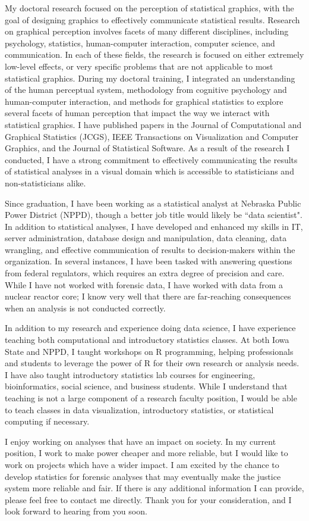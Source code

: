 \documentclass[12pt, letterpaper, sans]{moderncv}
\begin{document}
My doctoral research focused on the perception of statistical graphics, with the goal of designing graphics to effectively communicate statistical results. Research on graphical perception involves facets of many different disciplines, including psychology, statistics, human-computer interaction, computer science, and communication. In each of these fields, the research is focused on either extremely low-level effects, or very specific problems that are not applicable to most statistical graphics. During my doctoral training, I integrated an understanding of the human perceptual system, methodology from cognitive psychology and human-computer interaction, and methods for graphical statistics to explore several facets of human perception that impact the way we interact with statistical graphics. I have published papers in the Journal of Computational and Graphical Statistics (JCGS), IEEE Transactions on Visualization and Computer Graphics, and the Journal of Statistical Software. As a result of the research I conducted, I have a strong commitment to effectively communicating the results of statistical analyses in a visual domain which is accessible to statisticians and non-statisticians alike. 

Since graduation, I have been working as a statistical analyst at Nebraska Public Power District (NPPD), though a better job title would likely be ``data scientist". In addition to statistical analyses, I have developed and enhanced my skills in IT, server administration, database design and manipulation, data cleaning, data wrangling, and effective communication of results to decision-makers within the organization. In several instances, I have been tasked with answering questions from federal regulators, which requires an extra degree of precision and care. While I have not worked with forensic data, I have worked with data from a nuclear reactor core; I know very well that there are far-reaching consequences when an analysis is not conducted correctly. 

In addition to my research and experience doing data science, I have experience teaching both computational and introductory statistics classes. At both Iowa State and NPPD, I taught workshops on R programming, helping professionals and students to leverage the power of R for their own research or analysis needs. I have also taught introductory statistics lab courses for engineering, bioinformatics, social science, and business students. While I understand that teaching is not a large component of a research faculty position, I would be able to teach classes in data visualization, introductory statistics, or statistical computing if necessary. 

I enjoy working on analyses that have an impact on society. In my current position, I work to make power cheaper and more reliable, but I would like to work on projects which have a wider impact. I am excited by the chance to develop statistics for forensic analyses that may eventually make the justice system more reliable and fair. If there is any additional information I can provide, please feel free to contact me directly. Thank you for your consideration, and I look forward to hearing from you soon. 


\makeletterclosing
\end{document}
